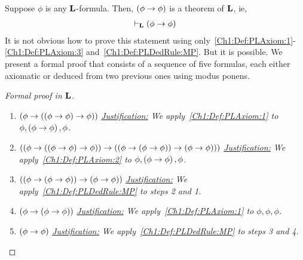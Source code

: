 \begin{boxexample}\label{Ch1:Eg:Self_implies_self}
    Suppose $\phi$ is any $\mathbf{L}$-formula. Then, $\left( \phi \to \phi \right)$ is a theorem of $\mathbf{L}$, ie,
    \begin{align}
        \vdash_{\mathbf{L}} \left( \phi \to \phi \right)
        \label{Ch1:Eq:Self_implies_self}
    \end{align}
    It is not obvious how to prove this statement using only~\ref{Ch1:Def:PLAxiom:1}-\ref{Ch1:Def:PLAxiom:3} and~\ref{Ch1:Def:PLDedRule:MP}. But it is possible. We present a formal proof that consists of a sequence of five formulas, each either axiomatic or deduced from two previous ones using modus ponens.
    \begin{proof}[Formal proof in $\mathbf{L}$]\hfill
        \begin{enumerate}
            \item $\left( \phi \to \left( \left( \phi \to \phi \right) \to \phi \right) \right)$
            \newline
            \textit{\underline{Justification:}
                We apply~\ref{Ch1:Def:PLAxiom:1} to $\phi, \left( \phi \to \phi \right), \phi$.
            }

            \item $\left( \left( \phi \to \left( \left( \phi \to \phi \right) \to \phi \right) \right) \to \left( \left( \phi \to \left( \phi \to \phi \right) \right) \to \left( \phi \to \phi \right) \right) \right)$
            \newline
            \textit{\underline{Justification:}
                We apply~\ref{Ch1:Def:PLAxiom:2} to $\phi, \left( \phi \to \phi \right), \phi$.
            }

            \item $\left( \left( \phi \to \left( \phi \to \phi \right) \right) \to \left( \phi \to \phi \right) \right)$
            \newline
            \textit{\underline{Justification:}
            We apply~\ref{Ch1:Def:PLDedRule:MP} to steps 2 and 1. %
            }

            \item $\left( \phi \to \left( \phi \to \phi \right) \right)$
            \newline
            \textit{\underline{Justification:}
                We apply~\ref{Ch1:Def:PLAxiom:1} to $\phi, \phi, \phi$.
            }

            \item $\left( \phi \to \phi \right)$
            \newline
            \textit{\underline{Justification:}
                We apply~\ref{Ch1:Def:PLDedRule:MP} to steps 3 and 4.
            }
        \end{enumerate}
    \end{proof}
\end{boxexample}


